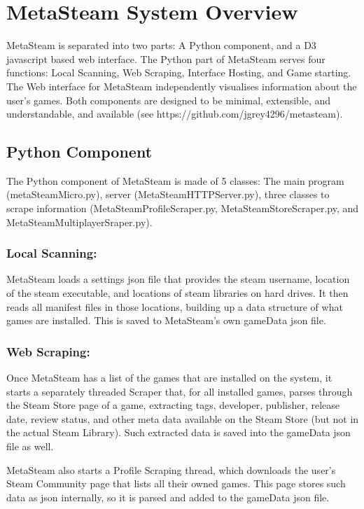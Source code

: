 \documentclass[11pt]{article}
\begin{document}
    
 \section*{MetaSteam System Overview}

MetaSteam is separated into two parts: A Python component, and a D3 javascript based web interface. The Python part of MetaSteam serves four functions: Local Scanning, Web Scraping, Interface Hosting, and Game starting. The Web interface for MetaSteam independently visualises information about the user's games. Both components are designed to be minimal, extensible, and understandable, and available (see https://github.com/jgrey4296/metasteam).

\subsection{Python Component}
The Python component of MetaSteam is made of 5 classes: The main program (metaSteamMicro.py), server (MetaSteamHTTPServer.py), three classes to scrape information (MetaSteamProfileScraper.py, MetaSteamStoreScraper.py, and MetaSteamMultiplayerSraper.py).

\subsubsection*{Local Scanning:}
MetaSteam loads a settings json file that provides the steam username, location of the steam executable, and locations of steam libraries on hard drives. It then reads all manifest files in those locations, building up a data structure of what games are installed. This is saved to MetaSteam's own gameData json file.

\subsubsection*{Web Scraping:}
Once MetaSteam has a list of the games that are installed on the system, it starts a separately threaded Scraper that, for all installed games, parses through the Steam Store page of a game, extracting tags, developer, publisher, release date, review status, and other meta data available on the Steam Store (but not in the actual Steam Library). Such extracted data is saved into the gameData json file as well.

MetaSteam also starts a Profile Scraping thread, which downloads the user's Steam Community page that lists all their owned games. This page stores such data as json internally, so it is parsed and added to the gameData json file.
\end{document}
